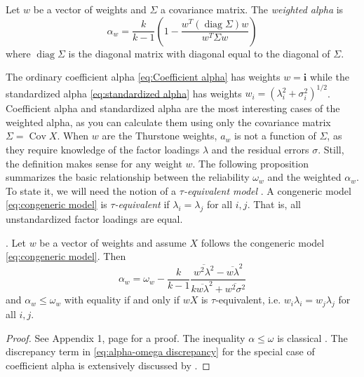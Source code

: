 \documentclass[twoside]{article}
\DeclareMathOperator{\Cov}{Cov}
\DeclareMathOperator{\diag}{diag}
\renewcommand{\sqrt}[1]{{(#1)^{1/2}}}
\begin{document}
\begin{defn}
Let $w$ be a vector of weights and $\Sigma$ a covariance matrix. The \textit{weighted alpha} is
\begin{equation}
\alpha_{w}=\frac{k}{k-1}\left(1-\frac{w^{T}(\diag\Sigma)w}{w^{T}\Sigma w}\right)\label{eq:weighted alpha}
\end{equation}
where $\diag\Sigma$ is the diagonal matrix with diagonal equal to the diagonal of $\Sigma$.
\end{defn}
The ordinary coefficient alpha \eqref{eq:Coefficient alpha} has weights $w=\mathbf{i}$
while the standardized alpha \eqref{eq:standardized alpha} has weights $w_{i}=\sqrt{\lambda_{i}^{2}+\sigma_{i}^{2}}$. Coefficient alpha and standardized alpha are the most interesting cases of the weighted alpha, as you can calculate them using only the covariance matrix $\Sigma = \Cov X$. When $w$ are the Thurstone weights, $a_w$ is not a function of $\Sigma$, as they require knowledge of the factor loadings $\lambda$ and the residual errors $\sigma$. Still, the definition makes sense for any weight $w$. The following proposition summarizes the basic relationship
between the reliability $\omega_{w}$ and the weighted $\alpha_{w}$. To state it, we will need
the notion of a \textit{$\tau$-equivalent model} \citep[][section 2.13]{Lord1968-ax}. A congeneric model \eqref{eq:congeneric model} is \textit{$\tau$-equivalent} if $\lambda_{i}=\lambda_{j}$ for all $i,j$. That is, all unstandardized
factor loadings are equal.
\begin{prop}
\label{prop:weighted alpha}. Let $w$ be a vector of weights and
assume $X$ follows the congeneric model \eqref{eq:congeneric model}. Then 
\begin{equation}
\alpha_{w}=\omega_{w}-\frac{k}{k-1}\frac{\overline{w^{2}\lambda^{2}}-\overline{w\lambda}^{2}}{k\overline{w\lambda}^{2}+\overline{w^{2}\sigma^{2}}}\label{eq:alpha-omega discrepancy}
\end{equation}
and $\alpha_w \leq \omega_w$ with equality if and only if $wX$ is $\tau$-equivalent, i.e. $w_i\lambda_{i}=w_j\lambda_{j}$
for all $i,j$.
\end{prop}
\begin{proof}
See Appendix 1, page \pageref{proof:weighted alpha}
for a proof. The inequality $\alpha\leq\omega$ is classical \citep[][Theorem 4.4.3]{Lord1968-ax}. The discrepancy term in \eqref{eq:alpha-omega discrepancy} for the special case of coefficient alpha is extensively discussed by \citet{Raykov1997-bu}. 
\end{proof}
\end{document}
